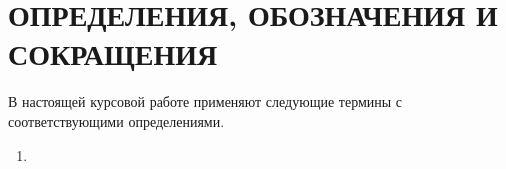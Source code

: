\section*{\large ОПРЕДЕЛЕНИЯ, ОБОЗНАЧЕНИЯ И СОКРАЩЕНИЯ}

В настоящей курсовой работе применяют следующие термины с соответствующими определениями.


\begin{enumerate}
	\item 
\end{enumerate}
\pagebreak